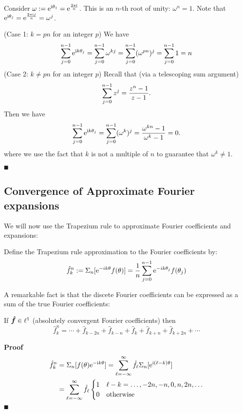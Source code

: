 Consider $\omega := {\rm e}^{{\rm i} \theta_1} = {\rm e}^{2 \pi {\rm i} \over n}$. This is an $n$-th root of unity: $\ensuremath{\omega}^n = 1$. Note that ${\rm e}^{{\rm i} \theta_j} ={\rm e}^{2 \pi {\rm i} j \over n}= \omega^j$.

(Case 1: $k = pn$ for an integer $p$) We have
\[
\sum_{j=0}^{n-1} {\rm e}^{{\rm i} k \theta_j} = \sum_{j=0}^{n-1} \omega^{kj} = \sum_{j=0}^{n-1} ({\omega^{pn}})^j =   \sum_{j=0}^{n-1} 1 = n
\]
(Case 2: $k \ensuremath{\neq} pn$ for an integer $p$)  Recall that (via a telescoping sum argument)
\[
\ensuremath{\sum}_{j=0}^{n-1} z^j = {z^n-1 \over z-1}.
\]
Then we have
\[
\sum_{j=0}^{n-1} {\rm e}^{{\rm i} k \theta_j} = \sum_{j=0}^{n-1} (\omega^k)^j = {\omega^{kn} -1 \over \omega^k -1} = 0.
\]
where we use the fact that $k$ is not a multiple of $n$ to guarantee that $\ensuremath{\omega}^k \ensuremath{\neq} 1$.

\ensuremath{\QED}

\subsection{Convergence of Approximate Fourier expansions}
We will now use the Trapezium rule to approximate Fourier coefficients and expansions:

\begin{definition} Define the Trapezium rule approximation to the Fourier coefficients by:
\[
\hat f_k^n := \Sigma_n[{\rm e}^{-i k \theta} f(\theta)]  = {1 \over n} \sum_{j=0}^{n-1} {\rm e}^{-i k \theta_j} f(\theta_j)
\]
\end{definition}

A remarkable fact is that the discete Fourier coefficients can be expressed as a sum of the true Fourier coefficients:

\begin{theorem} If ${\mbox{\boldmath$\hat f$\unboldmath}} \in \ell^1$ (absolutely convergent Fourier coefficients) then
\[
\hat f_k^n = \ensuremath{\cdots} + \hat f_{k-2n} + \hat f_{k-n} + \hat f_k + \hat f_{k+n} + \hat f_{k+2n} + \ensuremath{\cdots}
\]
\end{theorem}
\textbf{Proof}
\begin{align*}
\hat f_k^n &= \Sigma_n[f(\theta) {\rm e}^{-{\rm i} k \theta}] = \sum_{\ell=-\infty}^\infty \hat f_\ell \Sigma_n[{\rm e}^{{\rm i} (\ell-k) \theta}] \\
&= \sum_{\ell=-\infty}^\infty \hat f_\ell \begin{cases} 1 & \ell-k = \ldots,-2n,-n,0,n,2n,\ldots  \cr
0 & \hbox{otherwise}
\end{cases}
\end{align*}
\ensuremath{\QED}

